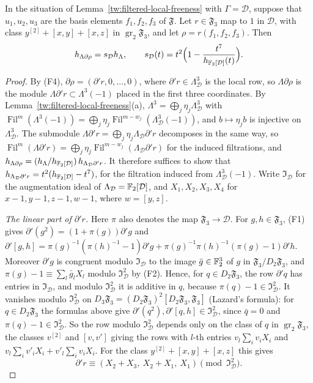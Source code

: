 \begin{lemma}\label{tw:local-fox}
In the situation of Lemma~\ref{tw:filtered-local-freeness} with $\Gamma=\mathcal D$,
suppose that $u_1,u_2,u_3$ are the basis elements $f_1,f_2,f_3$ of
$\mathfrak F$. Let $r\in\mathfrak F_3$ map to $1$ in $\mathcal D$, with class
$y^{[2]}+[x,y]+[x,z]$ in $\operatorname{gr}_2\mathfrak F_3$, and let
$\rho=r(f_1,f_2,f_3)$. Then
\[
 h_{\Lambda\partial\rho}=s_{\mathcal D}h_\Lambda,\qquad
 s_{\mathcal D}(t)=t^2\Bigl(1-\frac{t^7}{h_{\mathbb F_2[\mathcal D]}(t)}\Bigr).
\]
\end{lemma}

\begin{proof}
By (F4), $\partial\rho=(\partial'r,0,\dots,0)$, where
$\partial'r\in\Lambda_{\mathcal D}^3$ is the local row, so $\Lambda\partial\rho$ is the
module $\Lambda\partial'r\subset\Lambda^3(-1)$ placed in the first three
coordinates. By Lemma~\ref{tw:filtered-local-freeness}(a),
$\Lambda^3=\bigoplus_j\eta_j\Lambda_{\mathcal D}^3$ with
$\operatorname{Fil}^m(\Lambda^3(-1))=\bigoplus_j\eta_j\operatorname{Fil}^{m-w_j}(\Lambda_{\mathcal D}^3(-1))$,
and
$b\mapsto\eta_jb$ is injective on $\Lambda_{\mathcal D}^3$. The submodule
$\Lambda\partial'r=\bigoplus_j\eta_j\Lambda_{\mathcal D}\partial'r$ decomposes in the
same way, so
$\operatorname{Fil}^m(\Lambda\partial'r)=\bigoplus_j\eta_j\operatorname{Fil}^{m-w_j}(\Lambda_{\mathcal D}\partial'r)$
for
the induced filtrations, and
$h_{\Lambda\partial\rho}=(h_\Lambda/h_{\mathbb F_2[\mathcal D]})\,h_{\Lambda_{\mathcal D}\partial'r}$. It
therefore suffices to show that $h_{\Lambda_{\mathcal D}\partial'r}=t^2(h_{\mathbb F_2[\mathcal D]}-t^7)$, for
the filtration induced from $\Lambda_{\mathcal D}^3(-1)$. Write $\mathfrak I_{\mathcal D}$ for the augmentation ideal of
$\Lambda_{\mathcal D}=\mathbb F_2[\mathcal D]$, and $X_1,X_2,X_3,X_4$ for $x-1,y-1,z-1,w-1$, where
$w=[y,z]$.

\emph{The linear part of $\partial'r$.} Here $\pi$ also denotes the map
$\mathfrak F_3\to \mathcal D$. For $g,h\in\mathfrak F_3$, (F1) gives
$\partial'(g^2)=(1+\pi(g))\partial'g$ and
$\partial'[g,h]=\pi(g)^{-1}(\pi(h)^{-1}-1)\partial'g+\pi(g)^{-1}\pi(h)^{-1}(\pi(g)-1)\partial'h$.
Moreover $\partial'g$ is congruent modulo $\mathfrak I_{\mathcal D}$ to the image
$\bar g\in\mathbb F_2^3$ of $g$ in $\mathfrak F_3/D_2\mathfrak F_3$, and
$\pi(g)-1\equiv\sum_l\bar g_lX_l$ modulo $\mathfrak I_{\mathcal D}^2$ by (F2). Hence, for
$q\in D_2\mathfrak F_3$, the row $\partial'q$ has entries in $\mathfrak I_{\mathcal D}$,
and modulo $\mathfrak I_{\mathcal D}^2$ it is additive in $q$, because
$\pi(q)-1\in\mathfrak I_{\mathcal D}^2$. It vanishes modulo $\mathfrak I_{\mathcal D}^2$ on
$D_3\mathfrak F_3=(D_2\mathfrak F_3)^2[D_2\mathfrak F_3,\mathfrak F_3]$ (Lazard's
formula): for $q\in D_2\mathfrak F_3$ the formulas above give
$\partial'(q^2),\partial'[q,h]\in\mathfrak I_{\mathcal D}^2$, since $\bar q=0$ and
$\pi(q)-1\in\mathfrak I_{\mathcal D}^2$. So the row modulo $\mathfrak I_{\mathcal D}^2$ depends
only on the class of $q$ in $\operatorname{gr}_2\mathfrak F_3$, the classes
$v^{[2]}$ and $[v,v']$ giving the rows with $l$-th entries $v_l\sum_iv_iX_i$
and $v_l\sum_iv'_iX_i+v'_l\sum_iv_iX_i$.
For the class $y^{[2]}+[x,y]+[x,z]$ this gives
\[
 \partial'r\equiv(X_2+X_3,\ X_2+X_1,\ X_1)\pmod{\mathfrak I_{\mathcal D}^2}.
\]


\end{proof}

